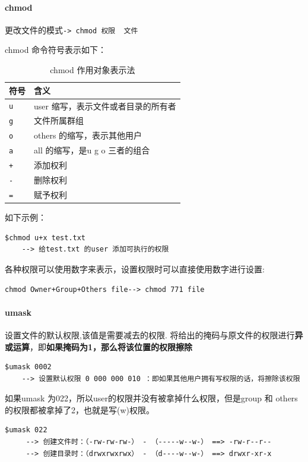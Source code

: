 \documentclass[UTF8,a4paper,12pt]{ctexbook}
\begin{document}
		 \paragraph{chmod}更改文件的模式\verb|-> chmod 权限  文件|
		 
			 chmod 命令符号表示如下：
				\begin{table}[H]
					\centering
					\caption{chmod 作用对象表示法}
					\begin{tabular}{l|m{14cm}}
						\hline
						符号 	   	   & 含义\\
						\hline
						\verb|u |		& user 缩写，表示文件或者目录的所有者\\
						\verb|g	|		& 文件所属群组\\
						\verb|o	|		& others 的缩写，表示其他用户\\
						\verb|a	|		& all 的缩写，是u g o 三者的组合\\
						\verb|+ |		& 添加权利\\
						\verb|-	|		& 删除权利\\
						\verb|=	|		& 赋予权利\\
						\hline
					\end{tabular}
				\end{table}	
			
			如下示例：	
			\begin{lstlisting}[frame=L,xleftmargin=.1\textwidth]
	$chmod u+x test.txt
	--> 给test.txt 的user 添加可执行的权限
			\end{lstlisting}
			
			各种权限可以使用数字来表示，设置权限时可以直接使用数字进行设置:
			
			\verb|chmod Owner+Group+Others file--> chmod 771 file|	 
		 \paragraph{umask}设置文件的默认权限,该值是需要减去的权限. 将给出的掩码与原文件的权限进行\textbf{异或运算}，即\textbf{如果掩码为1，那么将该位置的权限擦除}
			 \begin{lstlisting}[frame=L,xleftmargin=.1\textwidth]
	$umask 0002
	--> 设置默认权限 0 000 000 010 ：即如果其他用户拥有写权限的话，将擦除该权限
			 \end{lstlisting}
			 
			 如果umask 为022，所以user的权限并没有被拿掉什么权限，但是group 和 others 的权限都被拿掉了2，也就是写(w)权限。
			 \begin{lstlisting}[frame=L,xleftmargin=.1\textwidth]
	$umask 022
	 --> 创建文件时：（-rw-rw-rw-） - （-----w--w-） ==> -rw-r--r--
	 --> 创建目录时：（drwxrwxrwx） - （d----w--w-） ==> drwxr-xr-x
			 \end{lstlisting}
\end{document}
